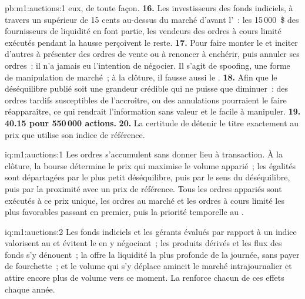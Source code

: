 \begin{solution}{pb:m1:auctions:1}
eux, de toute façon.
\textbf{16.} Les investisseurs des fonds indiciels, à travers un  supérieur de 15 cents
au-dessus du marché d'avant l'~: les 15\,000~\$ des fournisseurs de liquidité en font partie, les
vendeurs des ordres à cours limité exécutés pendant la hausse perçoivent le reste.
\textbf{17.} Pour faire monter le  et inciter d'autres à présenter des ordres de vente ou à
renoncer à enchérir, puis annuler ses ordres~: il n'a jamais eu l'intention de négocier.
Il s'agit de spoofing, une forme de manipulation de marché~; à la clôture, il
fausse aussi le .
\textbf{18.} Afin que le déséquilibre publié soit une grandeur crédible qui ne puisse
que diminuer~: des ordres tardifs susceptibles de l'accroître, ou des annulations
pourraient le faire réapparaître, ce qui rendrait l'information sans valeur et le 
facile à manipuler.
\textbf{19.} \textbf{40.15 pour 550\,000 actions.}
\textbf{20.} La certitude de détenir le titre exactement au prix que
utilise son indice de référence.
\end{solution}

\begin{solution}{iq:m1:auctions:1}
Les ordres s'accumulent sans donner lieu à transaction. À la clôture, la bourse détermine le prix
qui maximise le volume apparié~; les égalités sont départagées par le plus petit déséquilibre,
puis par le sens du déséquilibre, puis par la proximité avec un prix de référence.
Tous les ordres appariés sont exécutés à ce prix unique, les ordres au marché et les ordres à cours limité
les plus favorables passant en premier, puis la priorité temporelle au .
\end{solution}

\begin{solution}{iq:m1:auctions:2}
Les fonds indiciels et les gérants évalués par rapport à un indice valorisent au  et évitent
le  en y négociant~; les produits dérivés et les flux des fonds s'y dénouent~; la
 offre la liquidité la plus profonde de la journée, sans payer de fourchette~; et le volume qui
s'y déplace amincit le marché intrajournalier et attire encore plus de volume vers ce moment. La
 renforce chacun de ces effets chaque année.
\end{solution}

